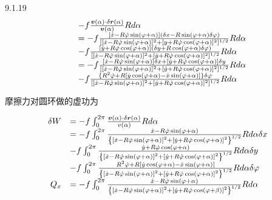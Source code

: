 \begin{problem}{9.1.19}
\[
\begin{array}{r l} & {- f \frac {\boldsymbol {v} (\alpha) \cdot \delta \boldsymbol {r} (\alpha)}{\boldsymbol {v} (\alpha)} R d \alpha} \\ & {= - f \frac {[ \dot {x} - R \dot {\varphi} \sin (\varphi + \alpha) ] (\delta x - R \sin (\varphi + \alpha) \delta \varphi)}{[ [ \dot {x} - R \dot {\varphi} \sin (\varphi + \alpha) ] ^ {2} + [ y + R \dot {\varphi} \cos (\varphi + \alpha) ] ^ {2} ] ^ {1 / 2}} R d \alpha} \\ & {- f \frac {[ \dot {y} + R \dot {\varphi} \cos (\varphi + \alpha) ] (\delta y + R \cos (\varphi + \alpha) \delta \varphi)}{[ [ \dot {x} - R \dot {\varphi} \sin (\varphi + \alpha) ] ^ {2} + [ \dot {y} + R \dot {\varphi} \cos (\varphi + \alpha) ] ^ {2} ] ^ {1 / 2}} R d \alpha} \\ & {= - f \frac {[ \dot {x} - R \dot {\varphi} \sin (\varphi + \alpha) ] \delta x + [ \dot {y} + R \dot {\varphi} \cos (\varphi + \alpha) ] \delta y}{[ [ \dot {x} - R \dot {\varphi} \sin (\varphi + \alpha) ] ^ {2} + [ \dot {y} + R \dot {\varphi} \cos (\varphi + \alpha) ] ^ {2} ] ^ {1 / 2}} R d \alpha} \\ & {- f \frac {\{R ^ {2} \dot {\varphi} + R [ \dot {y} \cos (\varphi + \alpha) - \dot {x} \sin (\varphi + \alpha) ] \} \delta \varphi}{[ [ \dot {x} - R \dot {\varphi} \sin (\varphi + \alpha) ] ^ {2} + [ \dot {y} + R \dot {\varphi} \cos (\varphi + \alpha) ] ^ {2} ] ^ {1 / 2}} R d \alpha} \end{array}
\]

摩擦力对圆环做的虚功为

\[
\begin{array}{r l} \delta W & = - f \int_ {0} ^ {2 \pi} \frac {\boldsymbol {v} (\alpha) \cdot \delta \boldsymbol {r} (\alpha)}{v (\alpha)} R d \alpha \\ & = - f \int_ {0} ^ {2 \pi} \frac {\dot {x} - R \dot {\varphi} \sin (\varphi + \alpha)}{\left\{\left[ \dot {x} - R \dot {\varphi} \sin (\varphi + \alpha) \right] ^ {2} + \left[ \dot {y} + R \dot {\varphi} \cos (\varphi + \alpha) \right] ^ {2} \right\} ^ {1 / 2}} R d \alpha \delta x \\ & - f \int_ {0} ^ {2 \pi} \frac {\dot {y} + R \dot {\varphi} \cos (\varphi + \alpha)}{\left\{\left[ \dot {x} - R \dot {\varphi} \sin (\varphi + \alpha) \right] ^ {2} + \left[ \dot {y} + R \dot {\varphi} \cos (\varphi + \alpha) \right] ^ {2} \right\} ^ {1 / 2}} R d \alpha \delta y \\ & - f \int_ {0} ^ {2 \pi} \frac {R ^ {2} \dot {\varphi} + R [ \dot {y} \cos (\varphi + \alpha) - \dot {x} \sin (\varphi + \alpha) ]}{\left\{\left[ \dot {x} - R \dot {\varphi} \sin (\varphi + \alpha) \right] ^ {2} + \left[ \dot {y} + R \dot {\varphi} \cos (\varphi + \alpha) \right] ^ {2} \right\} ^ {1 / 2}} R d \alpha \delta \varphi \\ Q _ {x} & = - f \int_ {0} ^ {2 \pi} \frac {\dot {x} - R \dot {\varphi} \sin (\varphi + \alpha)}{\left\{\left[ \dot {x} - R \dot {\varphi} \sin (\varphi + \alpha) \right] ^ {2} + \left[ \dot {y} + R \dot {\varphi} \cos (\varphi + \beta) \right] ^ {2} \right\} ^ {1 / 2}} R d \alpha \end{array}
\]


\end{problem}
